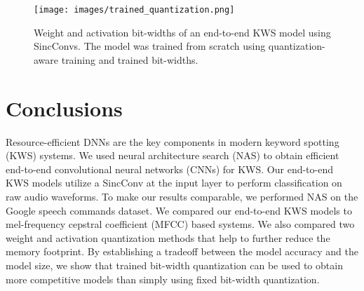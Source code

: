\documentclass[a4paper]{article}
\begin{document}
\begin{figure}[t]
	\centerline{\texttt{[image: images/trained\_quantization.png]}}
	\caption{Weight and activation bit-widths of an end-to-end KWS model using SincConvs. The model was trained from scratch using quantization-aware training and trained bit-widths.}
	\label{fig:trained_quantization}
\end{figure}

\section{Conclusions}
\label{sec:conclusions}
Resource-efficient DNNs are the key components in modern keyword spotting (KWS) systems. We used neural architecture search (NAS) to obtain efficient end-to-end convolutional neural networks (CNNs) for KWS. Our end-to-end KWS models utilize a SincConv at the input layer to perform classification on raw audio waveforms. To make our results comparable, we performed NAS on the Google speech commands dataset. We compared our end-to-end KWS models to mel-frequency cepstral coefficient (MFCC) based systems. We also compared two weight and activation quantization methods that help to further reduce the memory footprint. By establishing a tradeoff between the model accuracy and the model size, we show that trained bit-width quantization can be used to obtain more competitive models than simply using fixed bit-width quantization. 

\pagebreak



\end{document}

